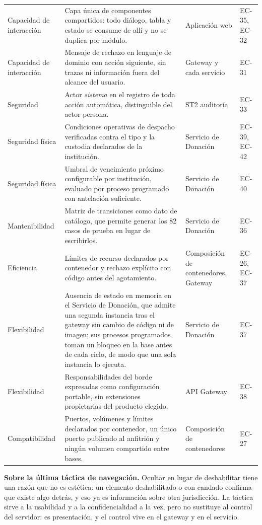 \documentclass[11pt,a4paper]{article}
\begin{document}
\begin{longtable}{L{2.4cm} L{5.6cm} L{3.4cm} L{2.4cm}}
Capacidad de interacción & Capa única de componentes compartidos: todo diálogo, tabla y estado se consume de allí y no se duplica por módulo. & Aplicación web & EC-35, EC-32 \\
Capacidad de interacción & Mensaje de rechazo en lenguaje de dominio con acción siguiente, sin trazas ni información fuera del alcance del usuario. & Gateway y cada servicio & EC-31 \\
Seguridad & Actor \emph{sistema} en el registro de toda acción automática, distinguible del actor persona. & ST2 auditoría & EC-33 \\
Seguridad física & Condiciones operativas de despacho verificadas contra el tipo y la custodia declarados de la institución. & Servicio de Donación & EC-39, EC-42 \\
Seguridad física & Umbral de vencimiento próximo configurable por institución, evaluado por proceso programado con antelación suficiente. & Servicio de Donación & EC-40 \\
Mantenibilidad & Matriz de transiciones como dato de catálogo, que permite generar los 82 casos de prueba en lugar de escribirlos. & Servicio de Donación & EC-36 \\
Eficiencia & Límites de recurso declarados por contenedor y rechazo explícito con código antes del agotamiento. & Composición de contenedores, Gateway & EC-26, EC-37 \\
Flexibilidad & Ausencia de estado en memoria en el Servicio de Donación, que admite una segunda instancia tras el gateway sin cambio de código ni de imagen; sus procesos programados toman un bloqueo en la base antes de cada ciclo, de modo que una sola instancia lo ejecuta. & Servicio de Donación & EC-37 \\
Flexibilidad & Responsabilidades del borde expresadas como configuración portable, sin extensiones propietarias del producto elegido. & API Gateway & EC-38 \\
Compatibilidad & Puertos, volúmenes y límites declarados por contenedor, un único puerto publicado al anfitrión y ningún volumen compartido entre bases. & Composición de contenedores & EC-27 \\
\end{longtable}

\noindent\textbf{Sobre la última táctica de navegación.} Ocultar en lugar de deshabilitar tiene una razón que no es estética: un elemento deshabilitado o con candado confirma que existe algo detrás, y eso ya es información sobre otra jurisdicción. La táctica sirve a la usabilidad y a la confidencialidad a la vez, pero no sustituye al control del servidor: es presentación, y el control vive en el gateway y en el servicio.
\end{document}

